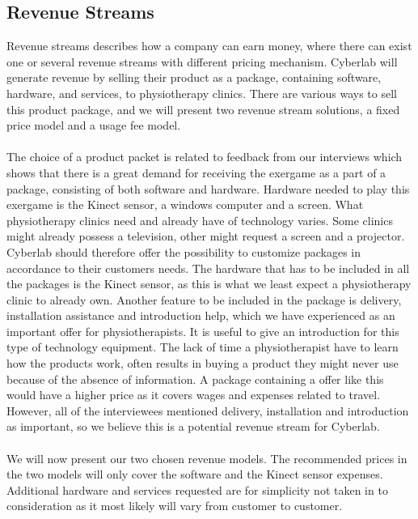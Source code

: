\subsection{Revenue Streams}
Revenue streams describes how a company can earn money, where there can exist one or several revenue streams with different pricing mechanism. Cyberlab will generate revenue by selling their product as a package, containing software, hardware, and services, to physiotherapy clinics. There are various ways to sell this product package, and we will present two revenue stream solutions, a fixed price model and a usage fee model. \\ \\ 
The choice of a product packet is related to feedback from our interviews which shows that there is a great demand for receiving the exergame as a part of a package, consisting of both software and hardware. Hardware needed to play this exergame is the Kinect sensor, a windows computer and a screen. What physiotherapy clinics need and already have of technology varies. Some clinics might already possess a television, other might request a screen and a projector. Cyberlab should therefore offer the possibility to customize packages in accordance to their customers needs. The hardware that has to be included in all the packages is the Kinect sensor, as this is what we least expect a physiotherapy clinic to already own. Another feature to be included in the package is delivery, installation assistance and introduction help, which we have experienced as an important offer for physiotherapists. It is useful to give an introduction for this type of technology equipment. The lack of time a physiotherapist have to learn how the products work, often results in buying a product they might never use because of the absence of information. A package containing a offer like this would have a higher price as it covers wages and expenses related to travel. However, all of the interviewees mentioned delivery, installation and introduction as important, so we believe this is a potential revenue stream for Cyberlab. \\ \\ 
We will now present our two chosen revenue models. The recommended prices in the two models will only cover the software and the Kinect sensor expenses. Additional hardware and services requested are for simplicity not taken in to consideration as it most likely will vary from customer to customer. \\ \\
